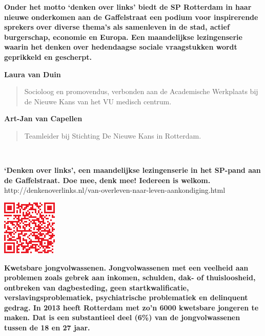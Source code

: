 \documentclass{article}
\begin{document}


\vfill

\textbf{Onder het motto `denken over links' biedt de SP Rotterdam in haar
nieuwe onderkomen aan de Gaffelstraat een podium voor inspirerende sprekers
over diverse thema's als samenleven in de stad, actief burgerschap, economie en
Europa. Een maandelijkse lezingenserie waarin het denken over hedendaagse
sociale vraagstukken wordt geprikkeld en gescherpt.}

\vfill


\vfill

\textbf{\large Laura van Duin}
\begin{quote}
  Socioloog en promovendus, verbonden aan de
  Academische Werkplaats bij de Nieuwe Kans van het VU
  medisch centrum.
\end{quote}

\vfill

\textbf{\large Art-Jan van Capellen}
\begin{quote}
  Teamleider bij Stichting De Nieuwe Kans in Rotterdam.
\end{quote}

\vfill

\colorbox{myred}{\parbox{\columnwidth}{\ \parbox[b]{.84\columnwidth}{\color{white}\raggedright
{\large\bf `Denken over links', een maandelijkse lezingenserie in het SP-pand aan
de Gaffelstraat. Doe mee, denk mee! Iedereen is welkom.} \\[.5em]
http://denkenoverlinks.nl/van-overleven-naar-leven-aankondiging.html\\[.2em]}
\hfill \includegraphics[scale=.46]{van-overleven-naar-leven.png}}}

\newpage


\vfill

\textbf{Kwetsbare jongvolwassenen. Jongvolwassenen met een veelheid aan problemen zoals
gebrek aan inkomen, schulden, dak- of thuisloosheid, ontbreken van
dagbesteding, geen startkwalificatie, verslavingsproblematiek, psychiatrische
problematiek en delinquent gedrag. In 2013 heeft Rotterdam met zo'n 6000
kwetsbare jongeren te maken. Dat is een substantieel deel (6\%) van de
jongvolwassenen tussen de 18 en 27 jaar.}
\end{document}

